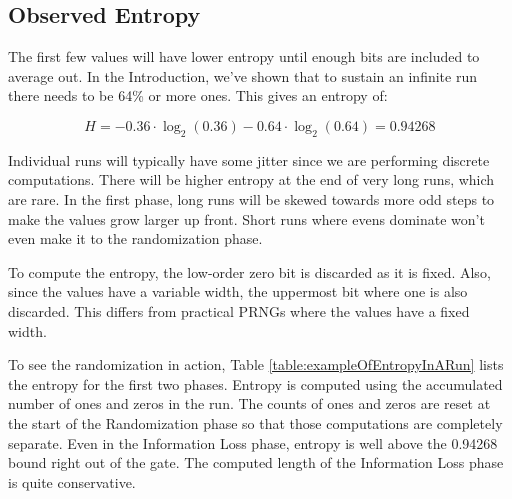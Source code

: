 \documentclass[preprint]{sigplanconf}
\begin{document}
\subsection{Observed Entropy}

The first few values will have lower entropy until enough bits are included to average out. In the Introduction, we've shown that to sustain an infinite run there needs to be 64\% or more ones. This gives an entropy of:

\[ H = -0.36 \cdot \log_2(0.36) - 0.64 \cdot \log_2(0.64) = 0.94268 \]

Individual runs will typically have some jitter since we are performing discrete computations. There will be higher entropy at the end of very long runs, which are rare. In the first phase, long runs will be skewed towards more odd steps to make the values grow larger up front. Short runs where evens dominate won't even make it to the randomization phase.

To compute the entropy, the low-order zero bit is discarded as it is fixed. Also, since the values have a variable width, the uppermost bit where one is also discarded. This differs from practical PRNGs where the values have a fixed width.

To see the randomization in action, Table \ref{table:exampleOfEntropyInARun} lists the entropy for the first two phases. Entropy is computed using the accumulated number of ones and zeros in the run. The counts of ones and zeros are reset at the start of the Randomization phase so that those computations are completely separate. Even in the Information Loss phase, entropy is well above the 0.94268 bound right out of the gate. The computed length of the Information Loss phase is quite conservative.
\end{document}
